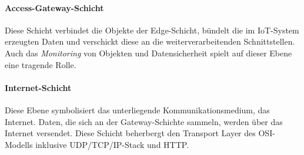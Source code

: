 \paragraph{Access-Gateway-Schicht} Diese Schicht verbindet die Objekte der Edge-Schicht, bündelt die im \ac{IoT}-System erzeugten Daten und verschickt diese an die weiterverarbeitenden Schnittstellen. Auch das \textit{Monitoring} von Objekten und Datensicherheit spielt auf dieser Ebene eine tragende Rolle. 

\paragraph{Internet-Schicht} Diese Ebene symbolisiert das unterliegende Kommunikationsmedium, das Internet. Daten, die sich an der Gateway-Schichte sammeln, werden über das Internet versendet. Diese Schicht beherbergt den Transport Layer des OSI-Modells inklusive UDP/TCP/IP-Stack und HTTP.

